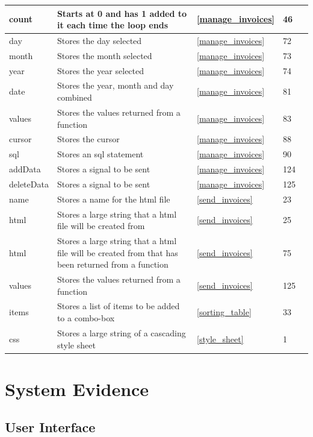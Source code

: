 \begin{center}
\begin{longtable}{|p{2cm}|p{2cm}|p{2cm}|p{2cm}|l}
		count & Starts at 0 and has 1 added to it each time the loop ends & \ref{manage_invoices} & 46 \\ \hline
		day & Stores the day selected & \ref{manage_invoices} & 72 \\ \hline
		month & Stores the month selected & \ref{manage_invoices} & 73 \\ \hline
		year & Stores the year selected & \ref{manage_invoices} & 74 \\ \hline
		date & Stores the year, month and day combined & \ref{manage_invoices} & 81 \\ \hline
		values & Stores the values returned from a function & \ref{manage_invoices} & 83 \\ \hline
		cursor & Stores the cursor & \ref{manage_invoices} & 88 \\ \hline
		sql & Stores an sql statement & \ref{manage_invoices} & 90 \\ \hline
		addData & Stores a signal to be sent  & \ref{manage_invoices} & 124 \\ \hline
		deleteData & Stores a signal to be sent  & \ref{manage_invoices} & 125\\ \hline
		name & Stores a name for the html file & \ref{send_invoices} & 23 \\ \hline
		html & Stores a large string that a html file will be created from & \ref{send_invoices} & 25 \\ \hline
		html & Stores a large string that a html file will be created from that has been returned from a function & \ref{send_invoices} & 75 \\ \hline
		values & Stores the values returned from a function & \ref{send_invoices} & 125 \\ \hline
		items & Stores a list of items to be added to a combo-box & \ref{sorting_table} & 33 \\ \hline
		css & Stores a large string of a cascading style sheet & \ref{style_sheet} & 1 \\ \hline
	\end{longtable}
\end{center}




\section{System Evidence}

\subsection{User Interface}

